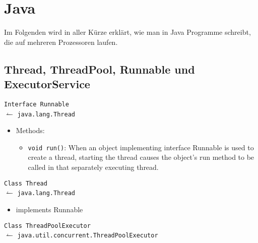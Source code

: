 \chapter{Java}

Im Folgenden wird in aller Kürze erklärt, wie man in Java Programme schreibt,
die auf mehreren Prozessoren laufen.

\section{Thread, ThreadPool, Runnable und ExecutorService}
\texttt{Interface Runnable}\\
\-\hspace{0.8cm}$\leftharpoonup$ \texttt{java.lang.Thread}%
\begin{itemize}
    \item Methods:
    \begin{itemize}
        \item \texttt{void run()}: When an object implementing interface
          Runnable is used to create a thread, starting the thread causes the
          object's run method to be called in that separately executing thread.
    \end{itemize}
\end{itemize}
\texttt{Class Thread}\\
\-\hspace{0.8cm}$\leftharpoonup$ \texttt{java.lang.Thread}%
\begin{itemize}
    \item implements Runnable
\end{itemize}
\texttt{Class ThreadPoolExecutor}\\
\-\hspace{0.8cm}$\leftharpoonup$ \texttt{java.util.concurrent.ThreadPoolExecutor}


\begin{beispiel}
    \inputminted[numbersep=5pt, tabsize=4]{java}{scripts/java/executer-service-future-example.java}
\end{beispiel}

